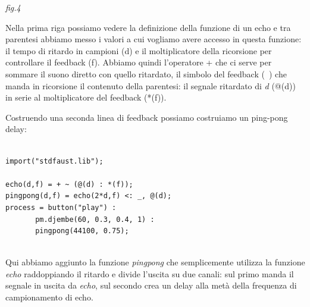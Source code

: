 \documentclass[11pt]{article}
\begin{document}
\begin{multicols*}{2}
\begin{center}
{\scriptsize \emph{fig.4 }}
\end{center}

Nella prima riga possiamo vedere la definizione della funzione di un echo e tra parentesi abbiamo messo i valori a cui vogliamo avere accesso in questa funzione: il tempo di ritardo in campioni (d) e il moltiplicatore della ricorsione per controllare il feedback (f). Abbiamo quindi l'operatore + che ci serve per sommare il suono diretto con quello ritardato, il simbolo del feedback (~) che manda in ricorsione il contenuto della parentesi: il segnale ritardato di \textit{d} (@(d)) in serie al moltiplicatore del feedback (*(f)).

Costruendo una seconda linea di feedback possiamo costruiamo un ping-pong delay:

\begin{Verbatim}[fontsize=\scriptsize]

import("stdfaust.lib");

echo(d,f) = + ~ (@(d) : *(f));
pingpong(d,f) = echo(2*d,f) <: _, @(d);
process = button("play") : 
       pm.djembe(60, 0.3, 0.4, 1) : 
       pingpong(44100, 0.75);
    
\end{Verbatim}

Qui abbiamo aggiunto la funzione \textit{pingpong} che semplicemente utilizza la funzione \textit{echo} raddoppiando il ritardo e divide l'uscita su due canali: sul primo manda il segnale in uscita da \textit{echo}, sul secondo crea un delay alla metà della frequenza di campionamento di echo.



\end{multicols*}
\end{document}
